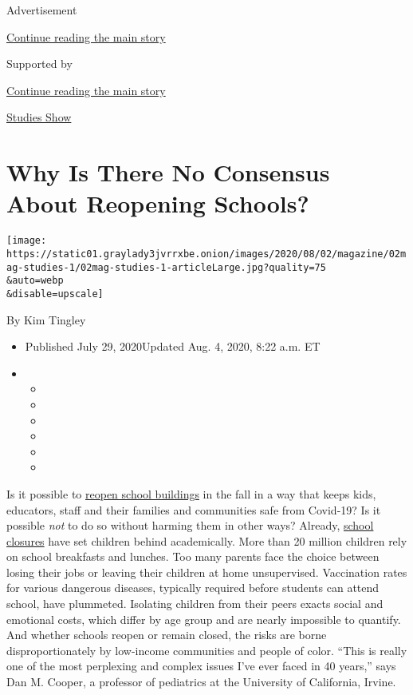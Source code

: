 Advertisement

\protect\hyperlink{after-top}{Continue reading the main story}

Supported by

\protect\hyperlink{after-sponsor}{Continue reading the main story}

\href{/column/studies-show}{Studies Show}

\hypertarget{why-is-there-no-consensus-about-reopening-schools}{%
\section{Why Is There No Consensus About Reopening
Schools?}\label{why-is-there-no-consensus-about-reopening-schools}}

\texttt{[image: https://static01.graylady3jvrrxbe.onion/images/2020/08/02/magazine/02mag-studies-1/02mag-studies-1-articleLarge.jpg?quality=75\\\&auto=webp\\\&disable=upscale]}

By Kim Tingley

\begin{itemize}
\item
  Published July 29, 2020Updated Aug. 4, 2020, 8:22 a.m. ET
\item
  \begin{itemize}
  \item
  \item
  \item
  \item
  \item
  \item
  \end{itemize}
\end{itemize}

Is it possible to
\href{https://www.nytimes3xbfgragh.onion/2020/08/03/us/school-closing-coronavirus.html}{reopen
school buildings} in the fall in a way that keeps kids, educators, staff
and their families and communities safe from Covid-19? Is it possible
\emph{not} to do so without harming them in other ways? Already,
\href{https://www.nytimes3xbfgragh.onion/2020/07/29/health/covid-school-reopening.html}{school
closures} have set children behind academically. More than 20 million
children rely on school breakfasts and lunches. Too many parents face
the choice between losing their jobs or leaving their children at home
unsupervised. Vaccination rates for various dangerous diseases,
typically required before students can attend school, have plummeted.
Isolating children from their peers exacts social and emotional costs,
which differ by age group and are nearly impossible to quantify. And
whether schools reopen or remain closed, the risks are borne
disproportionately by low-income communities and people of color. ``This
is really one of the most perplexing and complex issues I've ever faced
in 40 years,'' says Dan M. Cooper, a professor of pediatrics at the
University of California, Irvine.

